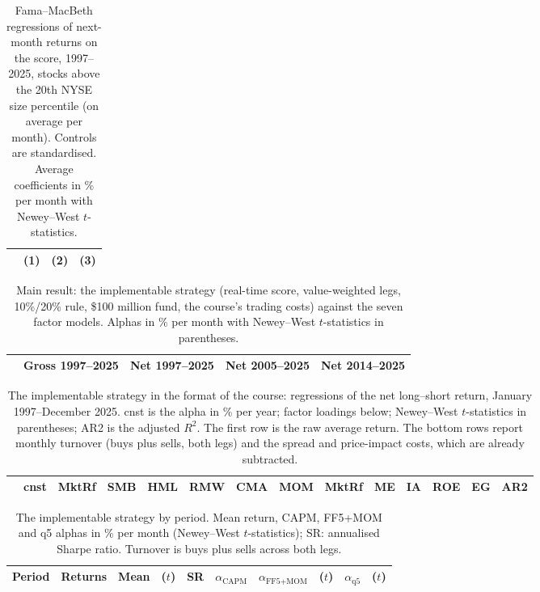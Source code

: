 \documentclass[12pt,a4paper]{article}
\begin{document}
\begin{singlespace}
\begin{table}[!htbp]\centering
\caption{Fama--MacBeth regressions of next-month returns on the score, 1997--2025, stocks above the 20th NYSE size percentile (on average \fmn{} per month). Controls are standardised. Average coefficients in \% per month with Newey--West $t$-statistics.}\label{tab:fm}
\footnotesize
\begin{tabular}{lrrr}\toprule
 & (1) & (2) & (3)\\\midrule

\bottomrule\end{tabular}
\end{table}

\begin{table}[!htbp]\centering
\caption{Main result: the implementable strategy (real-time score, value-weighted legs, 10\%/20\% rule, \$100 million fund, the course's trading costs) against the seven factor models. Alphas in \% per month with Newey--West $t$-statistics in parentheses.}\label{tab:allmodels}
\footnotesize
\begin{tabular}{lrrrrrrrr}\toprule
 & \multicolumn{2}{c}{Gross 1997--2025} & \multicolumn{2}{c}{Net 1997--2025} & \multicolumn{2}{c}{Net 2005--2025} & \multicolumn{2}{c}{Net 2014--2025}\\\midrule

\bottomrule\end{tabular}
\end{table}

\begin{table}[!htbp]\centering
\caption{The implementable strategy in the format of the course: regressions of the net long--short return, January 1997--December 2025. cnst is the alpha in \% per year; factor loadings below; Newey--West $t$-statistics in parentheses; AR2 is the adjusted $R^2$. The first row is the raw average return. The bottom rows report monthly turnover (buys plus sells, both legs) and the spread and price-impact costs, which are already subtracted.}\label{tab:lecture}
\scriptsize\setlength{\tabcolsep}{1.3pt}
\begin{tabular}{lrrrrrrrrrrrrr}\toprule
 & cnst & MktRf & SMB & HML & RMW & CMA & MOM & MktRf & ME & IA & ROE & EG & AR2\\\midrule

\midrule

\bottomrule\end{tabular}
\end{table}

\begin{table}[!htbp]\centering
\caption{The implementable strategy by period. Mean return, CAPM, FF5+MOM and q5 alphas in \% per month (Newey--West $t$-statistics); SR: annualised Sharpe ratio. Turnover is buys plus sells across both legs.}\label{tab:main}
\footnotesize
\begin{tabular}{llrrrrrrrr}\toprule
Period & Returns & Mean & ($t$) & SR & $\alpha_{\text{CAPM}}$ & $\alpha_{\text{FF5+MOM}}$ & ($t$) & $\alpha_{\text{q5}}$ & ($t$)\\\midrule

\bottomrule\end{tabular}
\end{table}


\end{singlespace}
\end{document}
